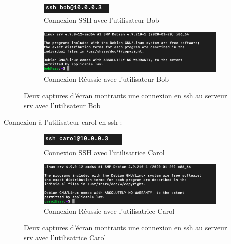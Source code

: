\documentclass[12pt]{article}
\begin{document}
\begin{figure}[h]
  \centering
  \begin{subfigure}{0.30\textwidth}
    \centering
    \includegraphics[width=\textwidth]{Image-TD-SSH-1/SSH-Bob.png}
    \caption{Connexion SSH avec l'utilisateur Bob}
  \end{subfigure}
  \vspace{0.9cm} %
  \begin{subfigure}{0.45\textwidth}
    \centering
    \includegraphics[width=\textwidth]{Image-TD-SSH-1/Connexion-SSH-Bob.png}
    \caption{Connexion Réussie avec l'utilisateur Bob}
  \end{subfigure}
  \caption{Deux captures d'écran montrants une connexion en ssh au serveur srv avec l'utilisateur Bob}
\end{figure}

\vspace{0.3cm}

Connexion à l'utilisateur carol en ssh  : 

\vspace{0.3cm}

\begin{figure}[h]
  \centering
  \begin{subfigure}{0.30\textwidth}
    \centering
    \includegraphics[width=\textwidth]{Image-TD-SSH-1/SSH-Carol.png}
    \caption{Connexion SSH avec l'utilisatrice Carol}
  \end{subfigure}
  \vspace{0.9cm} %
  \begin{subfigure}{0.45\textwidth}
    \centering
    \includegraphics[width=\textwidth]{Image-TD-SSH-1/Connexion-SSH-Carol.png}
    \caption{Connexion Réussie avec l'utilisatrice Carol}
  \end{subfigure}
  \caption{Deux captures d'écran montrants une connexion en ssh au serveur srv avec l'utilisatrice Carol}
\end{figure}
\end{document}
